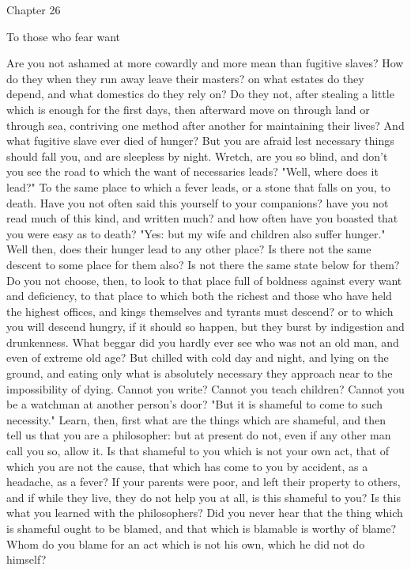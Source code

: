 \documentclass[a4paper]{article}
\begin{document}
Chapter 26

To those who fear want

    Are you not ashamed at more cowardly and more mean than fugitive slaves?
How do they when they run away leave their masters? on what estates do they
depend, and what domestics do they rely on? Do they not, after stealing a
little which is enough for the first days, then afterward move on through land
or through sea, contriving one method after another for maintaining their
lives? And what fugitive slave ever died of hunger? But you are afraid lest
necessary things should fall you, and are sleepless by night. Wretch, are you
so blind, and don't you see the road to which the want of necessaries leads?
"Well, where does it lead?" To the same place to which a fever leads, or a
stone that falls on you, to death. Have you not often said this yourself to
your companions? have you not read much of this kind, and written much? and how
often have you boasted that you were easy as to death?
    "Yes: but my wife and children also suffer hunger." Well then, does their
hunger lead to any other place? Is there not the same descent to some place for
them also? Is not there the same state below for them? Do you not choose, then,
to look to that place full of boldness against every want and deficiency, to
that place to which both the richest and those who have held the highest
offices, and kings themselves and tyrants must descend? or to which you will
descend hungry, if it should so happen, but they burst by indigestion and
drunkenness. What beggar did you hardly ever see who was not an old man, and
even of extreme old age? But chilled with cold day and night, and lying on the
ground, and eating only what is absolutely necessary they approach near to the
impossibility of dying. Cannot you write? Cannot you teach children? Cannot you
be a watchman at another person's door? "But it is shameful to come to such
necessity." Learn, then, first what are the things which are shameful, and then
tell us that you are a philosopher: but at present do not, even if any other
man call you so, allow it.
    Is that shameful to you which is not your own act, that of which you are
not the cause, that which has come to you by accident, as a headache, as a
fever? If your parents were poor, and left their property to others, and if
while they live, they do not help you at all, is this shameful to you? Is this
what you learned with the philosophers? Did you never hear that the thing which
is shameful ought to be blamed, and that which is blamable is worthy of blame?
Whom do you blame for an act which is not his own, which he did not do himself?
\end{document}
